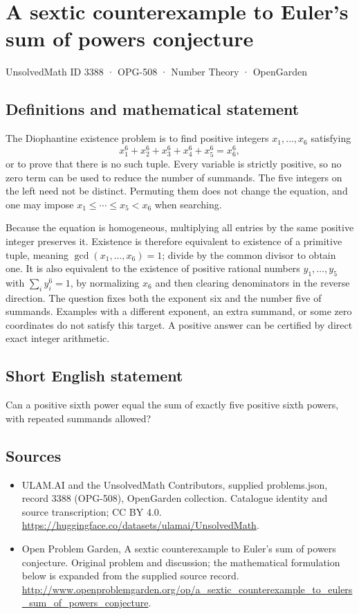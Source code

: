 \documentclass[11pt,a4paper]{article}
\begin{document}
\section*{A sextic counterexample to Euler's sum of powers conjecture}\label{3388}
{\small UnsolvedMath ID 3388 · OPG-508 · Number Theory · OpenGarden}
\subsection{Definitions and mathematical statement}
The Diophantine existence problem is to find positive integers
$x_1,\ldots,x_6$ satisfying
\[
             x_1^6+x_2^6+x_3^6+x_4^6+x_5^6=x_6^6,
\]
or to prove that there is no such tuple. Every variable is strictly
positive, so no zero term can be used to reduce the number of summands.
The five integers on the left need not be distinct. Permuting them
does not change the equation, and one may impose
$x_1\le\cdots\le x_5<x_6$ when searching.

Because the equation is homogeneous, multiplying all entries by the
same positive integer preserves it. Existence is therefore equivalent
to existence of a primitive tuple, meaning
$\gcd(x_1,\ldots,x_6)=1$; divide by the common divisor to obtain one.
It is also equivalent to the existence of positive rational numbers
$y_1,\ldots,y_5$ with $\sum_i y_i^6=1$, by normalizing $x_6$ and
then clearing denominators in the reverse direction.
The question fixes both the exponent six and the number five of
summands. Examples with a different exponent, an extra summand,
or some zero coordinates do not satisfy this target. A positive
answer can be certified by direct exact integer arithmetic.
\subsection{Short English statement}
Can a positive sixth power equal the sum of exactly five positive sixth powers, with repeated summands allowed?
\subsection{Sources}
\begin{itemize}
\item[S1] ULAM.AI and the UnsolvedMath Contributors, supplied problems.json, record 3388 (OPG-508), OpenGarden collection. Catalogue identity and source transcription; CC BY 4.0.
\url{https://huggingface.co/datasets/ulamai/UnsolvedMath}.
\item[S2] Open Problem Garden, A sextic counterexample to Euler's sum of powers conjecture. Original problem and discussion; the mathematical formulation below is expanded from the supplied source record.
\url{http://www.openproblemgarden.org/op/a_sextic_counterexample_to_eulers_sum_of_powers_conjecture}.
\end{itemize}
\end{document}
